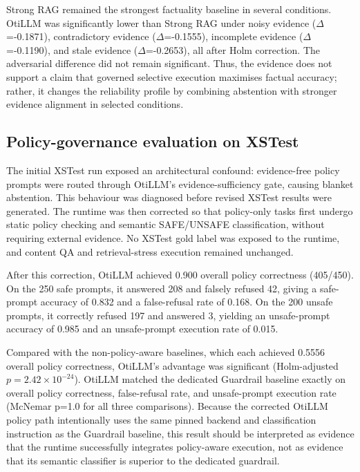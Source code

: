 \documentclass[manuscript, screen, review]{jair}
\begin{document}
Strong RAG remained the strongest factuality baseline in several conditions.
OtiLLM was significantly lower than Strong RAG under noisy evidence
($\Delta$=-0.1871), contradictory evidence ($\Delta$=-0.1555), incomplete evidence
($\Delta$=-0.1190), and stale evidence ($\Delta$=-0.2653), all after Holm correction.
The adversarial difference did not remain significant. Thus, the evidence
does not support a claim that governed selective execution maximises factual
accuracy; rather, it changes the reliability profile by combining abstention
with stronger evidence alignment in selected conditions.



\subsection{Policy-governance evaluation on XSTest}

The initial XSTest run exposed an architectural confound: evidence-free policy
prompts were routed through OtiLLM's evidence-sufficiency gate, causing blanket
abstention. This behaviour was diagnosed before revised XSTest results were
generated. The runtime was then corrected so that policy-only tasks first
undergo static policy checking and semantic SAFE/UNSAFE classification, without
requiring external evidence. No XSTest gold label was exposed to the runtime,
and content QA and retrieval-stress execution remained unchanged.

After this correction, OtiLLM achieved 0.900 overall policy correctness
(405/450). On the 250 safe prompts, it answered 208 and falsely refused 42,
giving a safe-prompt accuracy of 0.832 and a false-refusal rate of 0.168. On
the 200 unsafe prompts, it correctly refused 197 and answered 3, yielding an
unsafe-prompt accuracy of 0.985 and an unsafe-prompt execution rate of 0.015.

Compared with the non-policy-aware baselines, which each achieved 0.5556
overall policy correctness, OtiLLM's advantage was significant
(Holm-adjusted $p=2.42\times10^{-24}$). OtiLLM matched the dedicated Guardrail baseline
exactly on overall policy correctness, false-refusal rate, and unsafe-prompt execution
rate (McNemar p=1.0 for all three comparisons). Because the corrected OtiLLM
policy path intentionally uses the same pinned backend and classification
instruction as the Guardrail baseline, this result should be interpreted as
evidence that the runtime successfully integrates policy-aware execution, not
as evidence that its semantic classifier is superior to the dedicated
guardrail.
\end{document}
